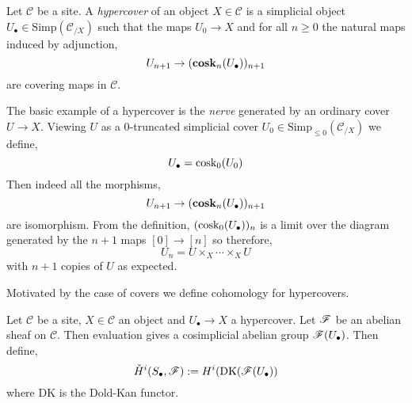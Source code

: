 \documentclass[12pt]{article}
\renewcommand{\C}{\mathcal{C}}
\newcommand{\DK}{\mathrm{DK}}
\renewcommand{\Cech}{\text{\v{C}ech}\xspace}
\newcommand{\Simp}{\mathrm{Simp}}
\begin{document}
\begin{defn}
Let $\C$ be a site. A \textit{hypercover} of an object $X \in \C$ is a simplicial object $U_\bullet \in \Simp(\C_{/X})$ such that the maps $U_0 \to X$ and for all $n \ge 0$ the natural maps induced by adjunction,
\[ U_{n+1} \to (\operatorname{\mathbf{cosk}}_n(U_\bullet))_{n+1} \]
are covering maps in $\C$.
\end{defn}

\begin{example}
The basic example of a hypercover is the \textit{\Cech nerve} generated by an ordinary cover $U \to X$. Viewing $U$ as a $0$-truncated simplicial cover $U_0 \in \Simp_{\le 0}(\C_{/X})$ we define,
\[ U_\bullet = \operatorname{\mathrm{cosk}}_0(U_0) \]
Then indeed all the morphisms,
\[ U_{n+1} \to (\operatorname{\mathbf{cosk}}_{n}(U_\bullet))_{n+1} \]
are isomorphism. From the definition, $(\operatorname{\mathrm{cosk}}_0(U_\bullet))_{n}$ is a limit over the diagram generated by the $n+1$ maps $[0] \to [n]$ so therefore,
\[ U_n = U \times_X \cdots \times_X U \]
with $n+1$ copies of $U$ as expected.  
\end{example}

Motivated by the case of \Cech covers we define \Cech cohomology for hypercovers.

\begin{defn}
Let $\C$ be a site, $X \in \C$ an object and $U_\bullet \to X$ a hypercover. Let $\mathscr{F}$ be an abelian sheaf on $\C$. Then evaluation gives a cosimplicial abelian group $\mathscr{F}(U_\bullet)$. Then define,
\[ \check{H}^i(S_\bullet, \F) := H^i(\DK(\F(U_\bullet)) \]
where $\DK$ is the Dold-Kan functor.
\end{defn}
\end{document}
